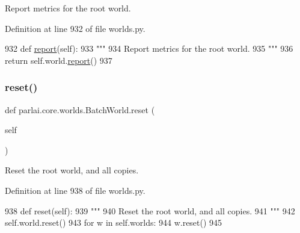 \begin{DoxyVerb}Report metrics for the root world.
\end{DoxyVerb}
 

Definition at line 932 of file worlds.\+py.


\begin{DoxyCode}
932     \textcolor{keyword}{def }\hyperlink{namespaceprojects_1_1convai2_1_1eval__f1_a01a47b9c08dad189837a51f085defc45}{report}(self):
933         \textcolor{stringliteral}{"""}
934 \textcolor{stringliteral}{        Report metrics for the root world.}
935 \textcolor{stringliteral}{        """}
936         \textcolor{keywordflow}{return} self.world.\hyperlink{namespaceprojects_1_1convai2_1_1eval__f1_a01a47b9c08dad189837a51f085defc45}{report}()
937 
\end{DoxyCode}
\mbox{\label{classparlai_1_1core_1_1worlds_1_1BatchWorld_a00ba541479129163a13a0377797504e1}} 
\subsubsection{\texorpdfstring{reset()}{reset()}}
{\footnotesize\ttfamily def parlai.\+core.\+worlds.\+Batch\+World.\+reset (\begin{DoxyParamCaption}\item[{}]{self }\end{DoxyParamCaption})}

\begin{DoxyVerb}Reset the root world, and all copies.
\end{DoxyVerb}
 

Definition at line 938 of file worlds.\+py.


\begin{DoxyCode}
938     \textcolor{keyword}{def }reset(self):
939         \textcolor{stringliteral}{"""}
940 \textcolor{stringliteral}{        Reset the root world, and all copies.}
941 \textcolor{stringliteral}{        """}
942         self.world.reset()
943         \textcolor{keywordflow}{for} w \textcolor{keywordflow}{in} self.worlds:
944             w.reset()
945 
\end{DoxyCode}
\mbox{\label{classparlai_1_1core_1_1worlds_1_1BatchWorld_a16a31209d87f0f9bf27871110bd63aa6}} 
